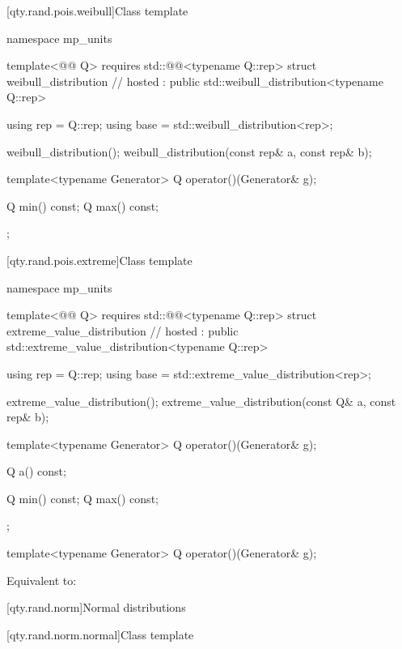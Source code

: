 [qty.rand.pois.weibull]{Class template }

\begin{codeblock}
namespace mp_units {
template<@@ Q>
  requires std::@@<typename Q::rep>
struct weibull_distribution                                                             // hosted
    : public std::weibull_distribution<typename Q::rep> {
  using rep = Q::rep;
  using base = std::weibull_distribution<rep>;

  weibull_distribution();
  weibull_distribution(const rep& a, const rep& b);

  template<typename Generator>
  Q operator()(Generator& g);

  Q min() const;
  Q max() const;
};
}
\end{codeblock}

[qty.rand.pois.extreme]{Class template }

\begin{codeblock}
namespace mp_units {
template<@@ Q>
  requires std::@@<typename Q::rep>
struct extreme_value_distribution                                                       // hosted
    : public std::extreme_value_distribution<typename Q::rep> {
  using rep = Q::rep;
  using base = std::extreme_value_distribution<rep>;

  extreme_value_distribution();
  extreme_value_distribution(const Q& a, const rep& b);

  template<typename Generator>
  Q operator()(Generator& g);

  Q a() const;

  Q min() const;
  Q max() const;
};
}
\end{codeblock}

\begin{itemdecl}
template<typename Generator>
Q operator()(Generator& g);
\end{itemdecl}

\begin{itemdescr}
\pnum
\effects
Equivalent to:
\end{itemdescr}

[qty.rand.norm]{Normal distributions}

[qty.rand.norm.normal]{Class template }


